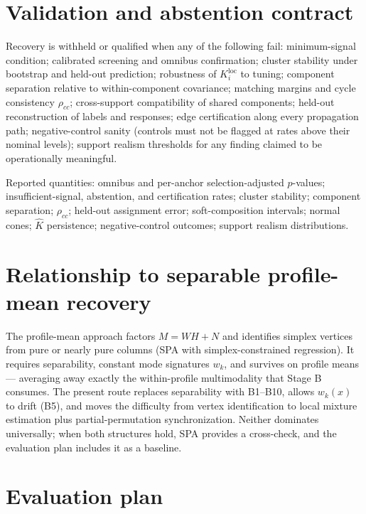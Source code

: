\documentclass[11pt]{article}
\begin{document}
\section{Validation and abstention contract}
\label{sec:abstention}

Recovery is withheld or qualified when any of the following fail: minimum-signal condition;
calibrated screening and omnibus confirmation; cluster stability under bootstrap and held-out
prediction; robustness of \(K_i^{\mathrm{loc}}\) to tuning; component separation relative to
within-component covariance; matching margins and cycle consistency \(\rho_{cc}\);
cross-support compatibility of shared components; held-out reconstruction of labels and
responses; edge certification along every propagation path; negative-control sanity (controls
must not be flagged at rates above their nominal levels); support realism thresholds for any
finding claimed to be operationally meaningful.

Reported quantities: omnibus and per-anchor selection-adjusted \(p\)-values;
insufficient-signal, abstention, and certification rates; cluster stability; component
separation; \(\rho_{cc}\); held-out assignment error; soft-composition intervals; normal
cones; \(\widehat K\) persistence; negative-control outcomes; support realism distributions.

\section{Relationship to separable profile-mean recovery}
\label{sec:spa}

The profile-mean approach factors \(M=WH+N\) and identifies simplex vertices from pure or
nearly pure columns (SPA with simplex-constrained regression). It requires separability,
constant mode signatures \(w_k\), and survives on profile means --- averaging away exactly
the within-profile multimodality that Stage B consumes. The present route replaces
separability with B1--B10, allows \(w_k(x)\) to drift (B5), and moves the difficulty from
vertex identification to local mixture estimation plus partial-permutation synchronization.
Neither dominates universally; when both structures hold, SPA provides a cross-check, and the
evaluation plan includes it as a baseline.

\section{Evaluation plan}
\label{sec:eval}
\end{document}
